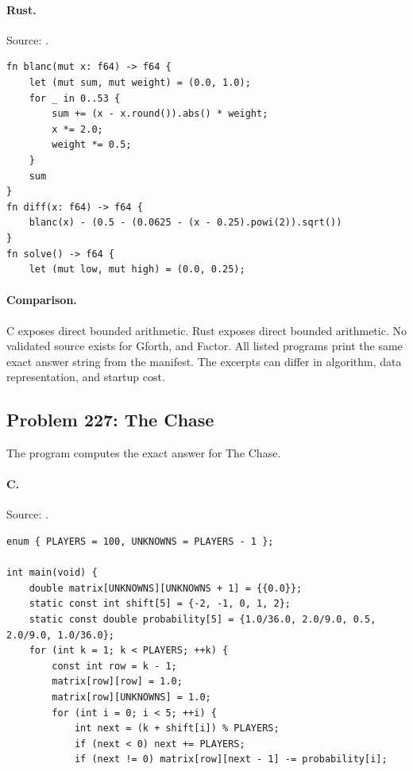 \paragraph{Rust.} Source: .
\begin{lstlisting}
fn blanc(mut x: f64) -> f64 {
    let (mut sum, mut weight) = (0.0, 1.0);
    for _ in 0..53 {
        sum += (x - x.round()).abs() * weight;
        x *= 2.0;
        weight *= 0.5;
    }
    sum
}
fn diff(x: f64) -> f64 {
    blanc(x) - (0.5 - (0.0625 - (x - 0.25).powi(2)).sqrt())
}
fn solve() -> f64 {
    let (mut low, mut high) = (0.0, 0.25);
\end{lstlisting}

\paragraph{Comparison.}
C exposes direct bounded arithmetic. Rust exposes direct bounded arithmetic.
No validated source exists for Gforth, and Factor.
All listed programs print the same exact answer string from the manifest. The excerpts can differ in algorithm, data representation, and startup cost.

\subsection{Problem 227: The Chase}
\label{walkthrough:p227}
The program computes the exact answer for The Chase.

\paragraph{C.} Source: .
\begin{lstlisting}
enum { PLAYERS = 100, UNKNOWNS = PLAYERS - 1 };

int main(void) {
    double matrix[UNKNOWNS][UNKNOWNS + 1] = {{0.0}};
    static const int shift[5] = {-2, -1, 0, 1, 2};
    static const double probability[5] = {1.0/36.0, 2.0/9.0, 0.5, 2.0/9.0, 1.0/36.0};
    for (int k = 1; k < PLAYERS; ++k) {
        const int row = k - 1;
        matrix[row][row] = 1.0;
        matrix[row][UNKNOWNS] = 1.0;
        for (int i = 0; i < 5; ++i) {
            int next = (k + shift[i]) % PLAYERS;
            if (next < 0) next += PLAYERS;
            if (next != 0) matrix[row][next - 1] -= probability[i];
\end{lstlisting}


